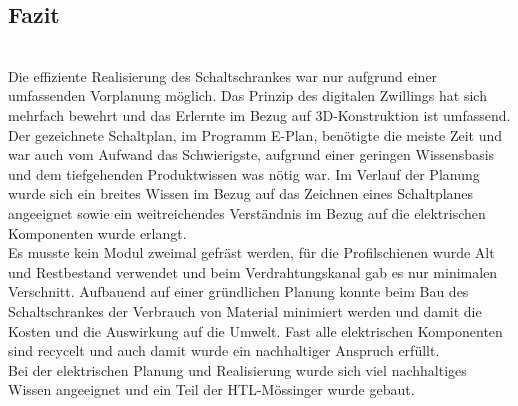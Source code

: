 \subsection{Fazit}\mbox{}\\
    Die effiziente Realisierung des Schaltschrankes war nur aufgrund einer umfassenden Vorplanung möglich. Das Prinzip des digitalen Zwillings hat sich mehrfach bewehrt und das Erlernte im Bezug auf 3D-Konstruktion ist umfassend.\\
    Der gezeichnete Schaltplan, im Programm E-Plan, benötigte die meiste Zeit und war auch vom Aufwand das Schwierigste, aufgrund einer geringen Wissensbasis und dem tiefgehenden Produktwissen was nötig war. Im Verlauf der Planung wurde sich ein breites Wissen im Bezug auf das Zeichnen eines Schaltplanes angeeignet sowie ein weitreichendes Verständnis im Bezug auf die elektrischen Komponenten wurde erlangt.\\
    Es musste kein Modul zweimal gefräst werden, für die Profilschienen wurde Alt und Restbestand verwendet und beim Verdrahtungskanal gab es nur minimalen Verschnitt. Aufbauend auf einer gründlichen Planung konnte beim Bau des Schaltschrankes der Verbrauch von Material minimiert werden und damit die Kosten und die Auswirkung auf die Umwelt. Fast alle elektrischen Komponenten sind recycelt und auch damit wurde ein nachhaltiger Anspruch erfüllt.\\
    Bei der elektrischen Planung und Realisierung wurde sich viel nachhaltiges Wissen angeeignet und ein Teil der HTL-Mössinger wurde gebaut.


